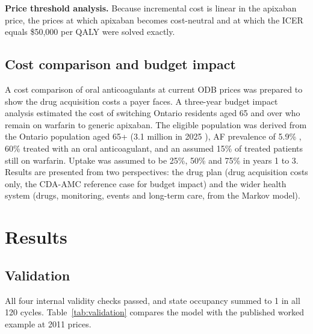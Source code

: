 \documentclass[11pt,letterpaper]{article}
\begin{document}
\textbf{Price threshold analysis.} Because incremental cost is linear in the apixaban price, the
prices at which apixaban becomes cost-neutral and at which the ICER equals \$50,000 per QALY were
solved exactly.

\subsection{Cost comparison and budget impact}

A cost comparison of oral anticoagulants at current ODB prices was prepared to show the drug
acquisition costs a payer faces. A three-year budget impact analysis estimated the cost of
switching Ontario residents aged 65 and over who remain on warfarin to generic apixaban. The
eligible population was derived from the Ontario population aged 65+ (3.1 million in 2025
\cite{ontpop}), AF prevalence of 5.9\% \cite{feinberg}, 60\% treated with an oral anticoagulant,
and an assumed 15\% of treated patients still on warfarin. Uptake was assumed to be 25\%, 50\% and
75\% in years 1 to 3. Results are presented from two perspectives: the drug plan (drug acquisition
costs only, the CDA-AMC reference case for budget impact) and the wider health system (drugs,
monitoring, events and long-term care, from the Markov model).

\section{Results}

\subsection{Validation}
\label{sec:validation}

All four internal validity checks passed, and state occupancy summed to 1 in all 120 cycles.
Table~\ref{tab:validation} compares the model with the published worked example at 2011 prices.
\end{document}
